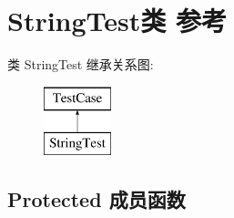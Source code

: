 \hypertarget{class_string_test}{}\section{String\+Test类 参考}
\label{class_string_test}
类 String\+Test 继承关系图\+:\begin{figure}[H]
\begin{center}
\leavevmode
\includegraphics[height=2.000000cm]{class_string_test}
\end{center}
\end{figure}
\subsection*{Protected 成员函数}
